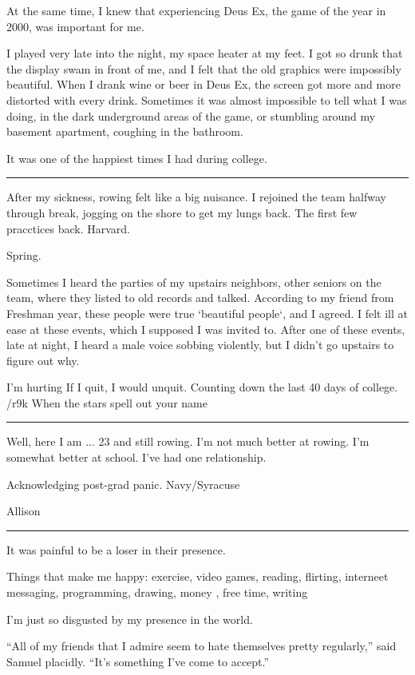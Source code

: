 At the same time, I knew that experiencing Deus Ex, the game of the year in
2000, was important for me.

I played very late into the night, my space heater at my feet.  I got so drunk
that the display swam in front of me, and I felt that the old graphics were
impossibly beautiful.  When I drank wine or beer in Deus Ex, the screen got more
and more distorted with every drink.  Sometimes it was almost impossible to tell
what I was doing, in the dark underground areas of the game, or stumbling around
my basement apartment, coughing in the bathroom.

It was one of the happiest times I had during college.

\plainfancybreak{12pt}{2}{* * *}

After my sickness, rowing felt like a big nuisance.  I rejoined the team halfway
through break, jogging on the shore to get my lungs back.  The first few
pracctices back.  Harvard.

Spring.

Sometimes I heard the parties of my upstairs neighbors, other seniors on the
team, where they listed to old records and talked.  According to my friend from
Freshman year, these people were true `beautiful people`, and I agreed.  I felt
ill at ease at these events, which I supposed I was invited to.  After one of
these events, late at night, I heard a male voice sobbing violently, but I
didn't go upstairs to figure out why.

I'm hurting
If I quit, I would unquit.
Counting down the last 40 days of college.
/r9k
When the stars spell out your name

\plainfancybreak{12pt}{2}{* * *}

Well, here I am ... 23 and still rowing.  I'm not much better at rowing.  I'm
somewhat better at school.  I've had one relationship.

Acknowledging post-grad panic.
Navy/Syracuse

Allison

\plainfancybreak{12pt}{2}{* * *}


It was painful to be a loser in their presence.  

Things that make me happy: exercise, video games, reading, flirting, interneet
messaging, programming, drawing, money , free time, writing

I'm just so disgusted by my presence in the world.

``All of my friends that I admire seem to hate themselves pretty regularly,''
said Samuel placidly.  ``It's something I've come to accept.''

